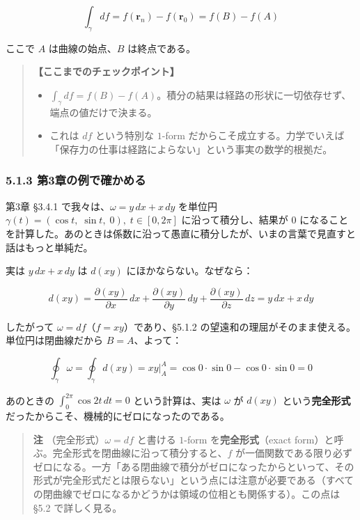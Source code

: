 \documentclass[a4paper,12pt,openany]{book}
\begin{document}
\[\int_\gamma df = f(\mathbf{r}_n) - f(\mathbf{r}_0) = f(B) - f(A)\]

ここで \(A\) は曲線の始点、\(B\) は終点である。

\begin{quote}
\textbf{【ここまでのチェックポイント】}

\begin{itemize}
\item
  \(\int_\gamma df = f(B) - f(A)\)。積分の結果は経路の形状に一切依存せず、端点の値だけで決まる。
\item
  これは \(df\) という特別な \(1\)-form
  だからこそ成立する。力学でいえば「保存力の仕事は経路によらない」という事実の数学的根拠だ。
\end{itemize}
\end{quote}

\hypertarget{ux7b2c3ux7ae0ux306eux4f8bux3067ux78baux304bux3081ux308b}{%
\subsubsection{5.1.3
第3章の例で確かめる}\label{ux7b2c3ux7ae0ux306eux4f8bux3067ux78baux304bux3081ux308b}}

第3章 §3.4.1 で我々は、\(\omega = y\,dx + x\,dy\) を単位円
\(\gamma(t) = (\cos t,\; \sin t,\; 0),\; t \in [0,2\pi]\)
に沿って積分し、結果が \(0\)
になることを計算した。あのときは係数に沿って愚直に積分したが、いまの言葉で見直すと話はもっと単純だ。

実は \(y\,dx + x\,dy\) は \(d(xy)\) にほかならない。なぜなら：

\[d(xy) = \frac{\partial (xy)}{\partial x}\,dx + \frac{\partial (xy)}{\partial y}\,dy + \frac{\partial (xy)}{\partial z}\,dz = y\,dx + x\,dy\]

したがって \(\omega = df\)（\(f = xy\)）であり、§5.1.2
の望遠和の理屈がそのまま使える。単位円は閉曲線だから \(B = A\)、よって：

\[\oint_\gamma \omega = \oint_\gamma d(xy) = xy\Big|_A^A = \cos 0\cdot\sin 0 - \cos 0\cdot\sin 0 = 0\]

あのときの \(\int_0^{2\pi} \cos 2t\,dt = 0\) という計算は、実は
\(\omega\) が \(d(xy)\)
という\textbf{完全形式}だったからこそ、機械的にゼロになったのである。

\begin{quote}
\textbf{注} （完全形式）\(\omega = df\) と書ける \(1\)-form
を\textbf{完全形式}（exact
form）と呼ぶ。完全形式を閉曲線に沿って積分すると、\(f\)
が一価関数である限り必ずゼロになる。一方「ある閉曲線で積分がゼロになったからといって、その形式が完全形式だとは限らない」という点には注意が必要である（すべての閉曲線でゼロになるかどうかは領域の位相とも関係する）。この点は
§5.2 で詳しく見る。
\end{quote}
\end{document}

